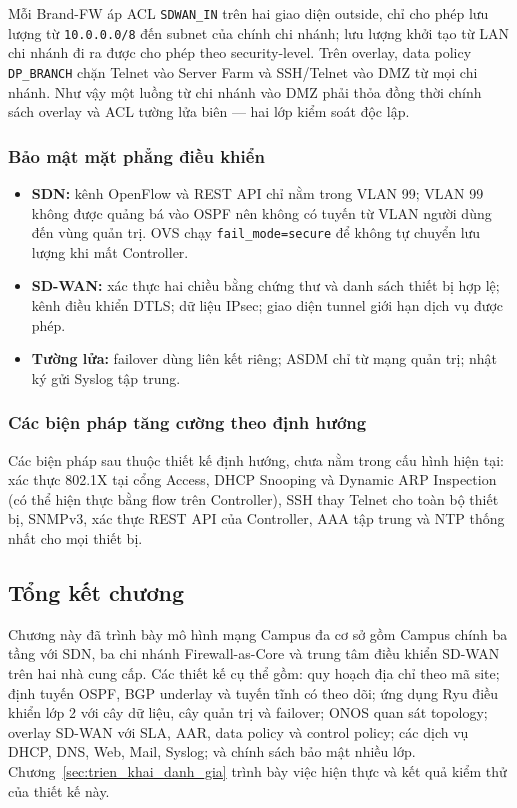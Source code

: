 Mỗi Brand-FW áp ACL \texttt{SDWAN\_IN} trên hai giao diện outside, chỉ cho phép lưu lượng từ \texttt{10.0.0.0/8} đến subnet của chính chi nhánh; lưu lượng khởi tạo từ LAN chi nhánh đi ra được cho phép theo security-level. Trên overlay, data policy \texttt{DP\_BRANCH} chặn Telnet vào Server Farm và SSH/Telnet vào DMZ từ mọi chi nhánh. Như vậy một luồng từ chi nhánh vào DMZ phải thỏa đồng thời chính sách overlay và ACL tường lửa biên --- hai lớp kiểm soát độc lập.

\subsubsection{Bảo mật mặt phẳng điều khiển}

\begin{itemize}
    \item \textbf{SDN:} kênh OpenFlow và REST API chỉ nằm trong VLAN 99; VLAN 99 không được quảng bá vào OSPF nên không có tuyến từ VLAN người dùng đến vùng quản trị. OVS chạy \texttt{fail\_mode=secure} để không tự chuyển lưu lượng khi mất Controller.
    \item \textbf{SD-WAN:} xác thực hai chiều bằng chứng thư và danh sách thiết bị hợp lệ; kênh điều khiển DTLS; dữ liệu IPsec; giao diện tunnel giới hạn dịch vụ được phép.
    \item \textbf{Tường lửa:} failover dùng liên kết riêng; ASDM chỉ từ mạng quản trị; nhật ký gửi Syslog tập trung.
\end{itemize}

\subsubsection{Các biện pháp tăng cường theo định hướng}

Các biện pháp sau thuộc thiết kế định hướng, chưa nằm trong cấu hình hiện tại: xác thực 802.1X tại cổng Access, DHCP Snooping và Dynamic ARP Inspection (có thể hiện thực bằng flow trên Controller), SSH thay Telnet cho toàn bộ thiết bị, SNMPv3, xác thực REST API của Controller, AAA tập trung và NTP thống nhất cho mọi thiết bị.

\subsection{Tổng kết chương}

Chương này đã trình bày mô hình mạng Campus đa cơ sở gồm Campus chính ba tầng với SDN, ba chi nhánh Firewall-as-Core và trung tâm điều khiển SD-WAN trên hai nhà cung cấp. Các thiết kế cụ thể gồm: quy hoạch địa chỉ theo mã site; định tuyến OSPF, BGP underlay và tuyến tĩnh có theo dõi; ứng dụng Ryu điều khiển lớp 2 với cây dữ liệu, cây quản trị và failover; ONOS quan sát topology; overlay SD-WAN với SLA, AAR, data policy và control policy; các dịch vụ DHCP, DNS, Web, Mail, Syslog; và chính sách bảo mật nhiều lớp. Chương~\ref{sec:trien_khai_danh_gia} trình bày việc hiện thực và kết quả kiểm thử của thiết kế này.
